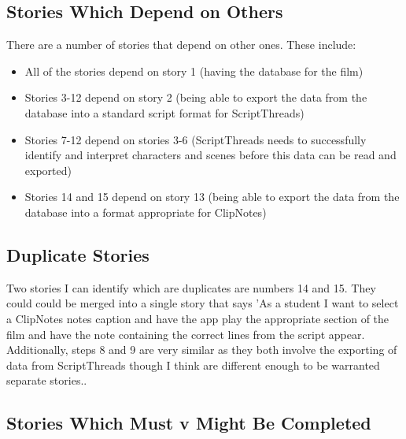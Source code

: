\documentclass{article}
\begin{document}
\subsection{Stories Which Depend on Others}
There are a number of stories that depend on other ones. These include:
\begin{itemize}
    \item All of the stories depend on story 1 (having the database for the film)
    \item Stories 3-12 depend on story 2 (being able to export the data from the database into a standard script format for ScriptThreads)
    \item Stories 7-12 depend on stories 3-6 (ScriptThreads needs to successfully identify and interpret characters and scenes before this data can be read and exported)
    \item Stories 14 and 15 depend on story 13 (being able to export the data from the database into a format appropriate for ClipNotes)
\end{itemize}

\subsection{Duplicate Stories}
Two stories I can identify which are duplicates are numbers 14 and 15. They could could be merged into a single story that says 'As a student I want to select a ClipNotes notes caption and have the app play the appropriate section of the film and have the note containing the correct lines from the script appear.\\

Additionally, steps 8 and 9 are very similar as they both involve the exporting of data from ScriptThreads though I think are different enough to be warranted separate stories..




\subsection{Stories Which Must v Might Be Completed}
\end{document}
